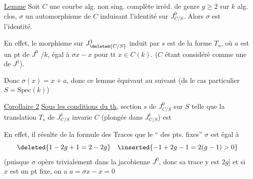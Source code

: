 
\uline{Lemme} Soit $C$ une courbe alg. non sing. complète  irréd. de genre $g\geq 2$ sur $k$ alg. clos, $\sigma$ un automorphisme de $C$ induisant l'identité sur $J^0_{C/S}$. Alors $\sigma$ est l'identité.

En effet, le morphisme sur $J^1_{\deleted{C/S}}$ induit par $s$ est de la forme $T_a$, où $a$ est un pt de $J^0$  $/k$, égal à $\sigma x-x$ pour tt $x\in C(k)$. ($C$ étant considéré comme une  de $J^1$).

Donc $\sigma(x)=x+a$, donc ce lemme équivaut au suivant (ds le cas particulier $S=\mathrm{Spec}(k)$)

\uline{Corollaire 2} \uline{Sous les conditions du th},   section $s$ de $J^0_{C/S}$ sur $S$ telle que la translation $T_s$ de $J^1_{C/S}$ invarie $C$ (plongée dans $J^1_{C/S}$) est  

En effet, il résulte de la formule des Traces que le `` des pts. fixes''  $\sigma$ est égal à
\[
\deleted{1-2g+1=2-2g}\quad \inserted{-1+2g-1=2(g-1)>0}
\]
(puisque $\sigma$ opère trivialement dans la jacobienne $J^0$, donc sa trace y est $2g$] et si $x$ est un pt fixe, on a $a=\sigma x-x=0$

